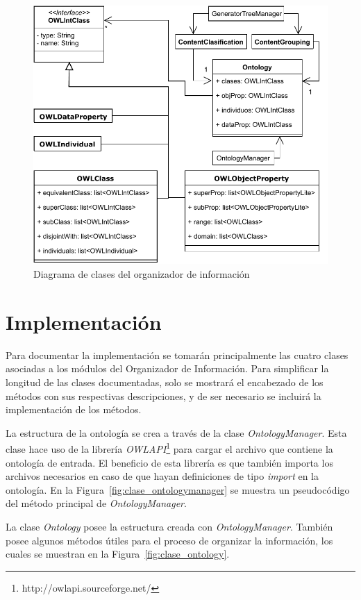 \begin{figure}
    \centering
    \includegraphics{img/organizacion_informacion/clases_organizador_informacion.pdf}
    \caption{Diagrama de clases del organizador de información}
    \label{fig:diagrama_clases_organizador}
\end{figure}

\section{Implementación}
Para documentar la implementación se tomarán principalmente las cuatro clases asociadas a los módulos del Organizador de Información. Para simplificar la longitud de las clases documentadas, solo se mostrará el encabezado de los métodos con sus respectivas descripciones, y de ser necesario se incluirá la implementación de los métodos.

La estructura de la ontología se crea a través de la clase \emph{OntologyManager}. Esta clase hace uso de la librería  \emph{OWLAPI}\footnote{http://owlapi.sourceforge.net/} para cargar el archivo que contiene la ontología de entrada. El beneficio de esta librería es que también importa los archivos necesarios en caso de que hayan definiciones de tipo \emph{import} en la ontología. En la Figura~\ref{fig:clase_ontologymanager} se muestra un pseudocódigo del método principal de \emph{OntologyManager}.

La clase \emph{Ontology} posee la estructura creada con \emph{OntologyManager}. También posee algunos métodos útiles para el proceso de organizar la información, los cuales se muestran en la Figura~\ref{fig:clase_ontology}.


